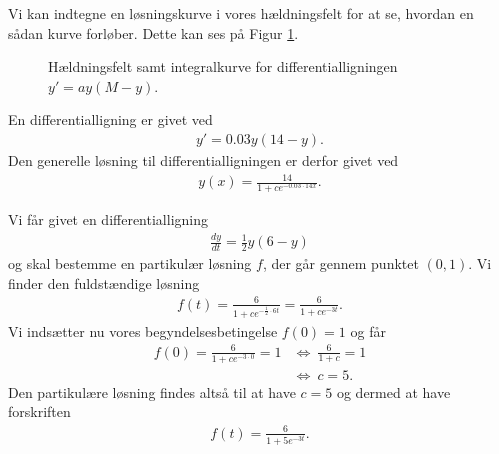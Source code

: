 Vi kan indtegne en løsningskurve i vores hældningsfelt for at se, hvordan en sådan kurve forløber. Dette kan ses på Figur \ref{fig:logkurve}.
\begin{figure}[H]
	\centering
	\caption{Hældningsfelt samt integralkurve for differentialligningen $y' = ay(M - y)$.}
	\label{fig:logkurve}
\end{figure}
\begin{exa}
	En differentialligning er givet ved
	\begin{align*}
		y' = 0.03y(14-y).
	\end{align*}
	Den generelle løsning til differentialligningen er derfor givet ved
	\begin{align*}
		y(x) = \frac{14}{1+ce^{-0.03\cdot 14 x}}.
	\end{align*}
\end{exa}
\begin{exa}
	Vi får givet en differentialligning
	\begin{align*}
		\frac{dy}{dt} = \frac{1}{2}y(6-y) 
	\end{align*}
	og skal bestemme en partikulær løsning $f$, der går gennem punktet $(0,1)$.
	Vi finder den fuldstændige løsning
	\begin{align*}
		f(t) = \frac{6}{1+ce^{-\frac{1}{2}\cdot 6t}} 
		= \frac{6}{1 + ce^{-3t}}.
	\end{align*}
	Vi indsætter nu vores begyndelsesbetingelse $f(0) = 1$ og får
	\begin{align*}
		f(0) = \frac{6}{1 + ce^{-3\cdot 0}} = 1 &\Leftrightarrow \ \frac{6}{1 + c} = 1 \\
		&\Leftrightarrow \ c = 5.
	\end{align*}
	Den partikulære løsning findes altså til at have $c = 5$ og dermed at have forskriften
	\begin{align*}
		f(t) = \frac{6}{1 + 5e^{-3t}}.
	\end{align*}
\end{exa}


